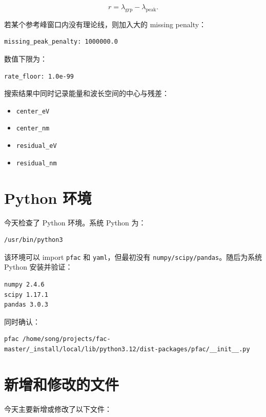 \documentclass[11pt,a4paper]{article}
\begin{document}
\[
r = \lambda_{\mathrm{grp}} - \lambda_{\mathrm{peak}}.
\]

若某个参考峰窗口内没有理论线，则加入大的 missing penalty：

\begin{lstlisting}
missing_peak_penalty: 1000000.0
\end{lstlisting}

数值下限为：

\begin{lstlisting}
rate_floor: 1.0e-99
\end{lstlisting}

搜索结果中同时记录能量和波长空间的中心与残差：

\begin{itemize}
  \item \texttt{center\_eV}
  \item \texttt{center\_nm}
  \item \texttt{residual\_eV}
  \item \texttt{residual\_nm}
\end{itemize}

\section{Python 环境}

今天检查了 Python 环境。系统 Python 为：

\begin{lstlisting}
/usr/bin/python3
\end{lstlisting}

该环境可以 import \texttt{pfac} 和 \texttt{yaml}，但最初没有
\texttt{numpy/scipy/pandas}。随后为系统 Python 安装并验证：

\begin{lstlisting}
numpy 2.4.6
scipy 1.17.1
pandas 3.0.3
\end{lstlisting}

同时确认：

\begin{lstlisting}
pfac /home/song/projects/fac-master/_install/local/lib/python3.12/dist-packages/pfac/__init__.py
\end{lstlisting}

\section{新增和修改的文件}

今天主要新增或修改了以下文件：
\end{document}
